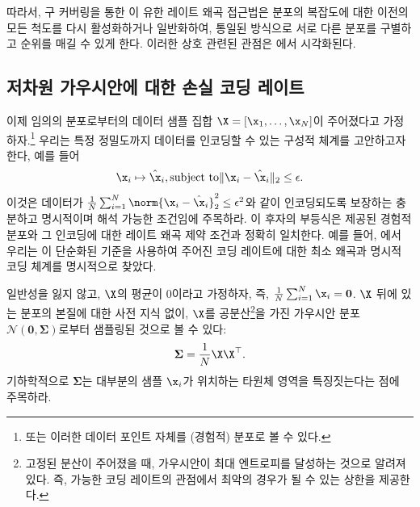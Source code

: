 \documentclass[../../book-main_ko.tex]{subfiles}
\begin{document}
\begin{remark}
	따라서, 구 커버링을 통한 이 유한 레이트 왜곡 접근법은 분포의 복잡도에 대한 이전의 모든 척도를 다시 활성화하거나 일반화하여, 통일된 방식으로 서로 다른 분포를 구별하고 순위를 매길 수 있게 한다.
	이러한 상호 관련된 관점은 에서 시각화된다.
\end{remark}

\subsection{저차원 가우시안에 대한 손실 코딩 레이트}\label{subsec:lossy DR}

이제 임의의 분포로부터의 데이터 샘플 집합 $\X = [\x_1, \ldots, \x_N]$이 주어졌다고 가정하자.\footnote{또는 이러한 데이터 포인트 자체를 (경험적) 분포로 볼 수 있다.} 우리는 특정 정밀도까지 데이터를 인코딩할 수 있는 구성적 체계를 고안하고자 한다, 예를 들어
\begin{equation}
	\x_i \mapsto \hat \x_i,      \mbox{subject to}      \|\x_i - \hat \x_i\|_2 \le \epsilon.
\end{equation}
이것은 데이터가 \(\frac{1}{N}\sum_{i = 1}^{N} \norm{\x_i- \hat \x_i}_2^{2} \le \epsilon^{2}\)와 같이 인코딩되도록 보장하는 충분하고 명시적이며 해석 가능한 조건임에 주목하라. 이 후자의 부등식은 제공된 경험적 분포와 그 인코딩에 대한 레이트 왜곡 제약 조건과 정확히 일치한다. 예를 들어, 에서 우리는 이 단순화된 기준을 사용하여 주어진 코딩 레이트에 대한 최소 왜곡과 명시적 코딩 체계를 명시적으로 찾았다.

일반성을 잃지 않고, $\X$의 평균이 0이라고 가정하자, 즉, $\frac{1}{N} \sum_{i = 1}^{N} \x_i = \boldsymbol{0}$. $\X$ 뒤에 있는 분포의 본질에 대한 사전 지식 없이, $\X$를 공분산\footnote{고정된 분산이 주어졌을 때, 가우시안이 최대 엔트로피를 달성하는 것으로 알려져 있다. 즉, 가능한 코딩 레이트의 관점에서 최악의 경우가 될 수 있는 상한을 제공한다.}을 가진 가우시안 분포 $\mathcal{N}(\boldsymbol{0}, {\boldsymbol{\Sigma}})$로부터 샘플링된 것으로 볼 수 있다:
\begin{equation}
	{\boldsymbol{\Sigma}} = \frac{1}{N} \X\X^\top.
\end{equation}
기하학적으로 ${\boldsymbol{\Sigma}}$는 대부분의 샘플 $\x_i$가 위치하는 타원체 영역을 특징짓는다는 점에 주목하라.
\end{document}

